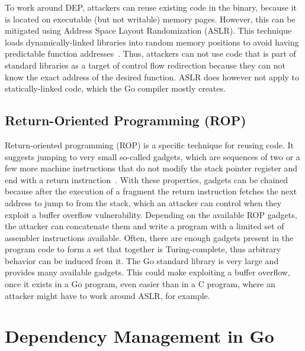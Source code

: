 To work around \acrshort{DEP}, attackers can reuse existing code in the binary, because it is located on executable (but
not writable) memory pages.
However, this can be mitigated using Address Space Layout Randomization (\acrshort{ASLR}).
This technique loads dynamically-linked libraries into random memory positions to avoid having predictable function
addresses~\cite{marco2014}.
Thus, attackers can not use code that is part of standard libraries as a target of control flow redirection because
they can not know the exact address of the desired function.
\acrshort{ASLR} does however not apply to statically-linked code, which the Go compiler mostly creates.



\subsection{Return-Oriented Programming (ROP)}\label{subsec:background:exploit-techniques:rop}

Return-oriented programming (\acrshort{ROP}) is a specific technique for reusing code.
It suggests jumping to very small so-called gadgets, which are sequences of two or a few more machine instructions that
do not modify the stack pointer register and end with a return instruction~\cite{roemer2012}.
With these properties, gadgets can be chained because after the execution of a fragment the return instruction fetches
the next address to jump to from the stack, which an attacker can control when they exploit a buffer overflow
vulnerability.
Depending on the available \acrshort{ROP} gadgets, the attacker can concatenate them and write a program with a limited
set of assembler instructions available.
Often, there are enough gadgets present in the program code to form a set that together is Turing-complete, thus
arbitrary behavior can be induced from it.
The Go standard library is very large and provides many available gadgets.
This could make exploiting a buffer overflow, once it exists in a Go program, even easier than in a C program, where an
attacker might have to work around \acrshort{ASLR}, for example.



\section{Dependency Management in Go}\label{sec:background:dependencies}

